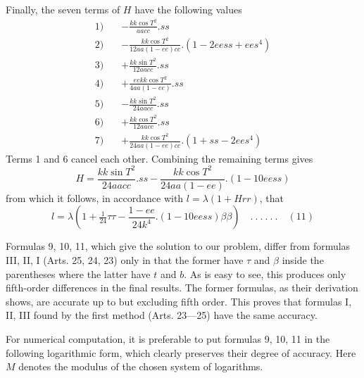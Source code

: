 %
Finally, the seven terms of \(H\) have the following values
\[
\begin{aligned}
1)\quad&-\frac{kk\cos T^2}{aacc}\mathord{.}ss\\
2)\quad&-\frac{kk\cos T^2}{12aa(1-ee)cc}\mathord{.}(1-2eess+ees^4)\\
3)\quad&+\frac{kk\sin T^2}{12aacc}\mathord{.}ss\\
4)\quad&+\frac{eekk\cos T^2}{4aa(1-ee)}\mathord{.}ss\\
5)\quad&-\frac{kk\sin T^2}{24aacc}\mathord{.}ss\\
6)\quad&+\frac{kk\cos T^2}{12aacc}\mathord{.}ss\\
7)\quad&+\frac{kk\cos T^2}{24aa(1-ee)cc}\mathord{.}(1+ss-2ees^4)
\end{aligned}
\]
Terms 1 and 6 cancel each other. Combining the remaining terms gives
\[
H=\frac{kk\sin T^2}{24aacc}\mathord{.}ss-\frac{kk\cos T^2}{24aa(1-ee)}\mathord{.}(1-10eess)
\]
from which it follows, in accordance with \(l=\lambda(1+Hrr)\), that
\[
l=\lambda(1+\tfrac1{24}\tau\tau-\frac{1-ee}{24k^4}\mathord{.}(1-10eess)\beta\beta)\quad .\ .\ .\ .\ .\ .\quad(11)
\]

Formulas 9, 10, 11, which give the solution to our problem, differ from formulas III, II, I (Arts. 25, 24, 23) only in that the former have \(\tau\) and \(\beta\) inside the parentheses where the latter have \(t\) and \(b\). As is easy to see, this produces only fifth-order differences in the final results. The former formulas, as their derivation shows, are accurate up to but excluding fifth order. This proves that formulas I, II, III found by the first method (Arts. 23---25) have the same accuracy.

For numerical computation, it is preferable to put formulas 9, 10, 11 in the following logarithmic form, which clearly preserves their degree of accuracy. Here \(M\) denotes the modulus of the chosen system of logarithms.
